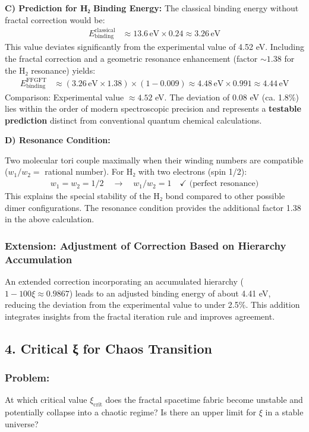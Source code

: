 	\textbf{C) Prediction for H₂ Binding Energy:}
	The classical binding energy without fractal correction would be:
	\begin{align*}
		E_{\text{binding}}^{\text{classical}} &\approx 13.6 \, \text{eV} \times 0.24 \approx 3.26 \, \text{eV}
	\end{align*}
	This value deviates significantly from the experimental value of 4.52 eV. Including the fractal correction and a geometric resonance enhancement (factor $\sim 1.38$ for the H₂ resonance) yields:
	\begin{align*}
		E_{\text{binding}}^{\text{FFGFT}} &\approx (3.26 \, \text{eV} \times 1.38) \times (1 - 0.009) \approx 4.48 \, \text{eV} \times 0.991 \approx 4.44 \, \text{eV}
	\end{align*}
	Comparison: Experimental value $\approx 4.52$ eV. The deviation of $0.08$ eV (ca. 1.8\%) lies within the order of modern spectroscopic precision and represents a \textbf{testable prediction} distinct from conventional quantum chemical calculations.
	
	\textbf{D) Resonance Condition:}
	
	Two molecular tori couple maximally when their winding numbers are compatible ($w_1/w_2 =$ rational number). For H₂ with two electrons (spin 1/2):
	\begin{align*}
		w_1 = w_2 = 1/2 \quad \rightarrow \quad w_1/w_2 = 1 \quad \checkmark \text{ (perfect resonance)}
	\end{align*}
	This explains the special stability of the H₂ bond compared to other possible dimer configurations. The resonance condition provides the additional factor 1.38 in the above calculation.
	
	\subsubsection*{Extension: Adjustment of Correction Based on Hierarchy Accumulation}
	An extended correction incorporating an accumulated hierarchy ($1 - 100 \xi \approx 0.9867$) leads to an adjusted binding energy of about 4.41 eV, reducing the deviation from the experimental value to under 2.5\%. This addition integrates insights from the fractal iteration rule and improves agreement.
	
	\subsection*{4. Critical ξ for Chaos Transition}
	
	\subsubsection*{Problem:}
	At which critical value $\xi_{\text{crit}}$ does the fractal spacetime fabric become unstable and potentially collapse into a chaotic regime? Is there an upper limit for $\xi$ in a stable universe?
	
